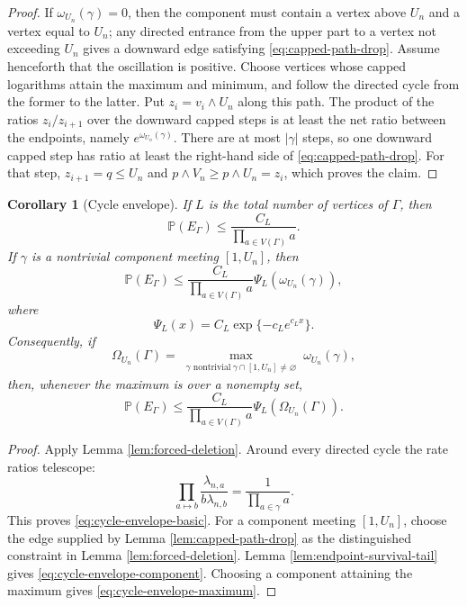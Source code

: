 \documentclass[11pt]{article}
\newtheorem{corollary}[theorem]{Corollary}
\theoremstyle{remark}
\newcommand{\Pp}{\mathbb P}
\begin{document}
\begin{proof}
If $\omega_{U_n}(\gamma)=0$, then the component must contain a vertex above
$U_n$ and a vertex equal to $U_n$; any directed entrance from the upper part
to a vertex not exceeding $U_n$ gives a downward edge satisfying
\eqref{eq:capped-path-drop}.  Assume henceforth that the oscillation is
positive.  Choose vertices whose capped logarithms attain the maximum and
minimum, and follow the directed cycle from the former to the latter.  Put
$z_i=v_i\wedge U_n$ along this path.  The product of the ratios
$z_i/z_{i+1}$ over the downward capped steps is at least the net ratio between
the endpoints, namely $e^{\omega_{U_n}(\gamma)}$.  There are at most
$|\gamma|$ steps, so one downward capped step has ratio at least the right-hand
side of \eqref{eq:capped-path-drop}.  For that step,
$z_{i+1}=q\le U_n$ and
$p\wedge V_n\ge p\wedge U_n=z_i$, which proves the claim.
\end{proof}

\begin{corollary}[Cycle envelope]
\label{cor:endpoint-cycle-envelope}
If $L$ is the total number of vertices of $\Gamma$, then
\[
        \Pp(E_\Gamma)
        \le\frac{C_L}{\prod_{a\in V(\Gamma)}a}.
\tag{10.42}\label{eq:cycle-envelope-basic}
\]
If $\gamma$ is a nontrivial component meeting $[1,U_n]$, then
\[
        \Pp(E_\Gamma)
        \le\frac{C_L}{\prod_{a\in V(\Gamma)}a}
        \Psi_L(\omega_{U_n}(\gamma)),
\tag{10.43}\label{eq:cycle-envelope-component}
\]
where
\[
        \Psi_L(x)=C_L\exp\{-c_Le^{c_Lx}\}.
\tag{10.44}\label{eq:cycle-envelope-psi}
\]
Consequently, if
\[
        \Omega_{U_n}(\Gamma)
        =\max_{\substack{\gamma\text{ nontrivial}\
                         \gamma\cap[1,U_n]\ne\varnothing}}
        \omega_{U_n}(\gamma),
\]
then, whenever the maximum is over a nonempty set,
\[
        \Pp(E_\Gamma)
        \le\frac{C_L}{\prod_{a\in V(\Gamma)}a}
        \Psi_L(\Omega_{U_n}(\Gamma)).
\tag{10.45}\label{eq:cycle-envelope-maximum}
\]
\end{corollary}

\begin{proof}
Apply Lemma \ref{lem:forced-deletion}.  Around every directed cycle the rate
ratios telescope:
\[
        \prod_{a\mapsto b}
        \frac{\lambda_{n,a}}{b\lambda_{n,b}}
        =\frac1{\prod_{a\in\gamma}a}.
\]
This proves \eqref{eq:cycle-envelope-basic}.  For a component meeting
$[1,U_n]$, choose the edge supplied by Lemma \ref{lem:capped-path-drop} as the
distinguished constraint in Lemma \ref{lem:forced-deletion}.  Lemma
\ref{lem:endpoint-survival-tail} gives
\eqref{eq:cycle-envelope-component}.  Choosing a component attaining the
maximum gives \eqref{eq:cycle-envelope-maximum}.
\end{proof}
\end{document}
